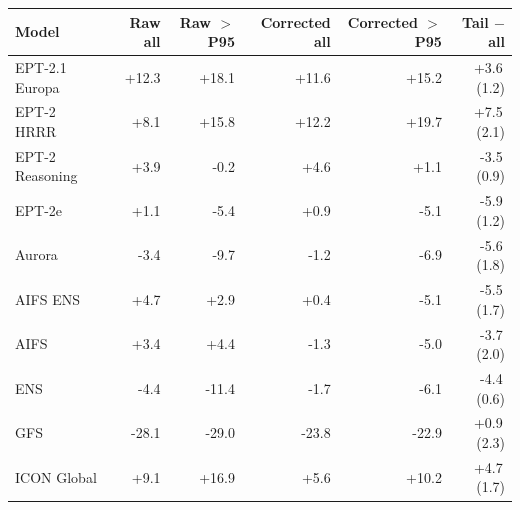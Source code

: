 \begin{tabular}{@{}lrrrrr@{}}
\toprule
Model & Raw all & Raw $>$P95 & Corrected all & Corrected $>$P95 & Tail $-$ all \\
\midrule
EPT-2.1 Europa & +12.3 & +18.1 & +11.6 & +15.2 & +3.6\,(1.2) \\
EPT-2 HRRR & +8.1 & +15.8 & +12.2 & +19.7 & +7.5\,(2.1) \\
EPT-2 Reasoning & +3.9 & -0.2 & +4.6 & +1.1 & -3.5\,(0.9) \\
EPT-2e & +1.1 & -5.4 & +0.9 & -5.1 & -5.9\,(1.2) \\
Aurora & -3.4 & -9.7 & -1.2 & -6.9 & -5.6\,(1.8) \\
AIFS ENS & +4.7 & +2.9 & +0.4 & -5.1 & -5.5\,(1.7) \\
AIFS & +3.4 & +4.4 & -1.3 & -5.0 & -3.7\,(2.0) \\
ENS & -4.4 & -11.4 & -1.7 & -6.1 & -4.4\,(0.6) \\
GFS & -28.1 & -29.0 & -23.8 & -22.9 & +0.9\,(2.3) \\
ICON Global & +9.1 & +16.9 & +5.6 & +10.2 & +4.7\,(1.7) \\
\bottomrule
\end{tabular}
